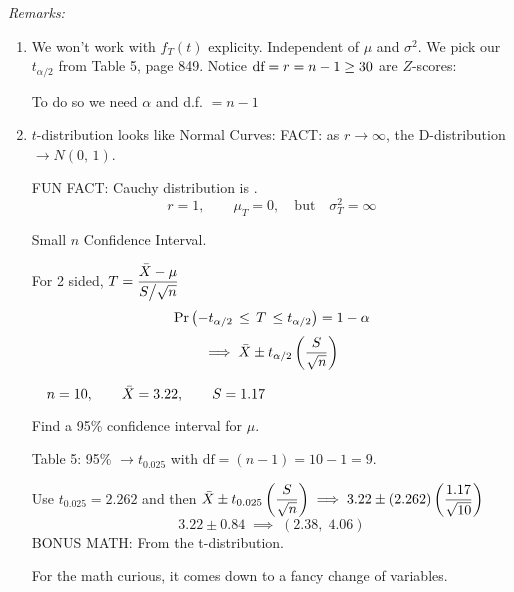 \nl \textit{Remarks:}
\begin{enumerate}[label=\textcircled{\raisebox{-1pt}{\arabic*}}]
    \item We won't work with $f_T(t)$ explicity.   Independent of $\mu$ and $\sigma^2$. We pick our $t_{\alpha/2}$ from Table 5, page 849. Notice $\text{df} = r = n-1 \geq 30$ are $Z$-scores:
    
    \nl To do so we need $\alpha$ and d.f. $= n-1$
    \newpage
    \newpage
    \item $t$-distribution looks like  Normal Curves:
    FACT: as $r \to \infty$, the D-distribution $\to N(0,\,1)$.

    \nl FUN FACT: Cauchy distribution is .
    $$r=1,\qquad \mu_T = 0, \quad \text{but} \quad \sigma^2_T = \infty$$

    \disc*    Small $n$ Confidence Interval.

    \nl For 2 sided, $T = \dfrac{\bar{X} - \mu}{S \big/ \sqrt{n}}$
    $$\P{-t_{\alpha/2} \, \leq \, T\, \leq t_{\alpha/2}} = 1 - \alpha$$
    $$\implies \Xbar \pm t_{\alpha/2} \pars{\dfrac{S}{\sqrt{n}}}$$

    \example $\quad n = 10, \qquad \bar{X} = 3.22, \qquad S = 1.17$

    \nl Find a 95\% confidence interval for $\mu$.

    \nl Table 5: \hspace{.5cm} 95\% $\longrightarrow t_{0.025}$ with $\text{df} = (n-1) = 10-1 = 9$.

    \nl Use $t_{0.025} = 2.262$ and then $\Xbar \pm t_{0.025} \pars{\dfrac{S}{\sqrt{n}}} \implies 3.22 \pm (2.262) \pars{\dfrac{1.17}{\sqrt{10}}}$
    $$3.22 \pm 0.84 \; \implies \; (2.38,\;4.06)$$
    \newpage
    BONUS MATH: From the t-distribution.

    \nl For the math curious, it comes down to a fancy change of variables.


\end{enumerate}
